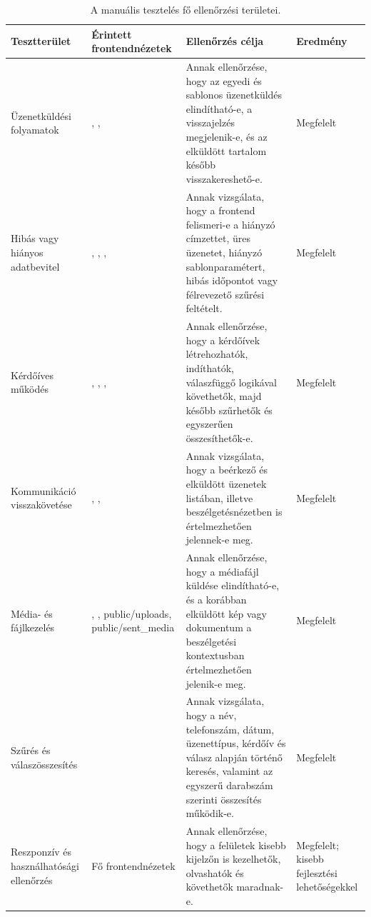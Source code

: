 \begin{table}[H]
\centering
\caption{A manuális tesztelés fő ellenőrzési területei.}
\label{tab:manualis-teszteles}
\vspace{0.6em}
\footnotesize
\setlength{\tabcolsep}{3pt}
\renewcommand{\arraystretch}{1.25}

\begin{tabularx}{\textwidth}{|>{\raggedright\arraybackslash}p{}|>{\raggedright\arraybackslash}p{}|Y|>{\raggedright\arraybackslash}p{0.14\textwidth}|}
\hline
\textbf{Tesztterület} &
\textbf{Érintett frontendnézetek} &
\textbf{Ellenőrzés célja} &
\textbf{Eredmény} \\
\hline

Üzenetküldési folyamatok &
, ,  &
Annak ellenőrzése, hogy az egyedi és sablonos üzenetküldés elindítható-e, a visszajelzés megjelenik-e, és az elküldött tartalom később visszakereshető-e. &
Megfelelt \\
\hline

Hibás vagy hiányos adatbevitel &
, , ,  &
Annak vizsgálata, hogy a frontend felismeri-e a hiányzó címzettet, üres üzenetet, hiányzó sablonparamétert, hibás időpontot vagy félrevezető szűrési feltételt. &
Megfelelt \\
\hline

Kérdőíves működés &
, , ,  &
Annak ellenőrzése, hogy a kérdőívek létrehozhatók, indíthatók, válaszfüggő logikával követhetők, majd később szűrhetők és egyszerűen összesíthetők-e. &
Megfelelt \\
\hline

Kommunikáció visszakövetése &
, ,  &
Annak vizsgálata, hogy a beérkező és elküldött üzenetek listában, illetve beszélgetésnézetben is értelmezhetően jelennek-e meg. &
Megfelelt \\
\hline

Média- és fájlkezelés &
, , public/uploads, public/sent\_media &
Annak ellenőrzése, hogy a médiafájl küldése elindítható-e, és a korábban elküldött kép vagy dokumentum a beszélgetési kontextusban értelmezhetően jelenik-e meg. &
Megfelelt \\
\hline

Szűrés és válaszösszesítés &
 &
Annak vizsgálata, hogy a név, telefonszám, dátum, üzenettípus, kérdőív és válasz alapján történő keresés, valamint az egyszerű darabszám szerinti összesítés működik-e. &
Megfelelt \\
\hline

Reszponzív és használhatósági ellenőrzés &
Fő frontendnézetek &
Annak ellenőrzése, hogy a felületek kisebb kijelzőn is kezelhetők, olvashatók és követhetők maradnak-e. &
Megfelelt; kisebb fejlesztési lehetőségekkel \\
\hline

\end{tabularx}
\end{table}

